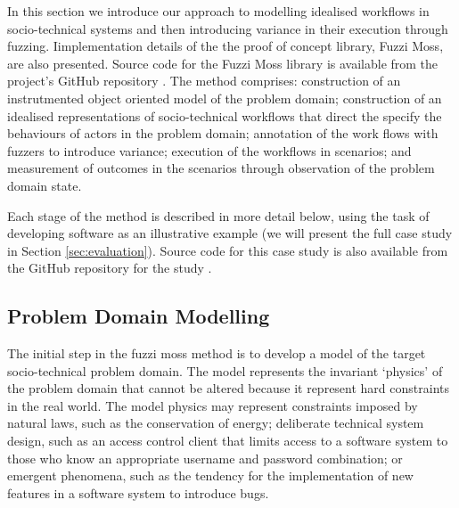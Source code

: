 \documentclass{sig-alternate}
\begin{document}
In this section we introduce our approach to modelling idealised workflows in
socio-technical systems and then introducing variance in their execution through
fuzzing.  Iimplementation details of the the proof of concept library, Fuzzi
Moss, are also presented.  Source code for the Fuzzi Moss library is available
from the project's GitHub repository \citep{storer2016fuzzi-moss-scm-repo}.  The
method comprises: construction of an instrutmented object oriented model of the
problem domain; construction of an idealised representations of socio-technical
workflows that direct the specify the behaviours of actors in the problem
domain; annotation of the work flows with fuzzers to introduce variance;
execution of the workflows in scenarios; and measurement of outcomes in the
scenarios through observation of the problem domain state.

Each stage of the method is described in more detail below, using the task of
developing software as an illustrative example (we will present the full case
study in Section \ref{sec:evaluation}). Source code for this case study is also
available from the GitHub repository for the study
\citep{storer2016softdev-workflow-scm}.


\subsection{Problem Domain Modelling}


The initial step in the fuzzi moss method is to develop a model of the target
socio-technical problem domain.  The model represents the invariant `physics' of
the problem domain that cannot be altered because it represent hard constraints
in the real world.  The model physics may represent constraints imposed by
natural laws, such as the conservation of energy; deliberate technical system
design, such as an access control client that limits access to a software system
to those who know an appropriate username and password combination; or emergent
phenomena, such as the tendency for the implementation of new features in a
software system to introduce bugs.
\end{document}

